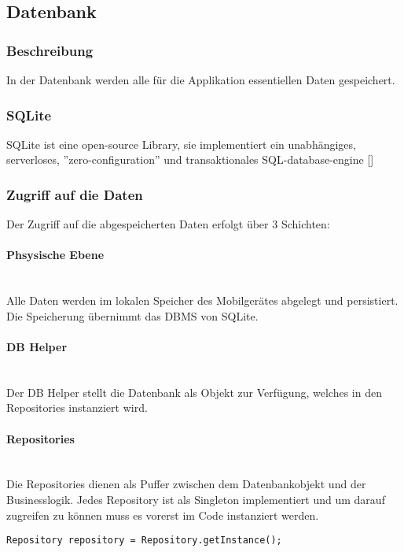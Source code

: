 \documentclass[FIPLY_base.tex]{subfiles}
\begin{document}
\subsection{Datenbank}
\subsubsection{Beschreibung}
In der Datenbank werden alle für die Applikation essentiellen Daten gespeichert.

\subsubsection{SQLite}
SQLite ist eine open-source Library, sie implementiert ein unabhängiges, serverloses, ''zero-configuration'' und transaktionales SQL-database-engine [\cite{dbSQLite}]


\subsubsection{Zugriff auf die Daten}
Der Zugriff auf die abgespeicherten Daten erfolgt über 3 Schichten:

\paragraph{Phsysische Ebene}\ \\
Alle Daten werden im lokalen Speicher des Mobilgerätes abgelegt und persistiert. Die Speicherung übernimmt das DBMS von SQLite.

\paragraph{DB Helper}\ \\
Der DB Helper stellt die Datenbank als Objekt zur Verfügung, welches in den Repositories instanziert wird.


\newpage
\paragraph{Repositories}\ \\
Die Repositories dienen als Puffer zwischen dem Datenbankobjekt und der Businesslogik.
Jedes Repository ist als Singleton implementiert und um darauf zugreifen zu können muss es vorerst im Code instanziert werden.
\ \\
\begin{lstlisting}
Repository repository = Repository.getInstance();
\end{lstlisting}
\end{document}

